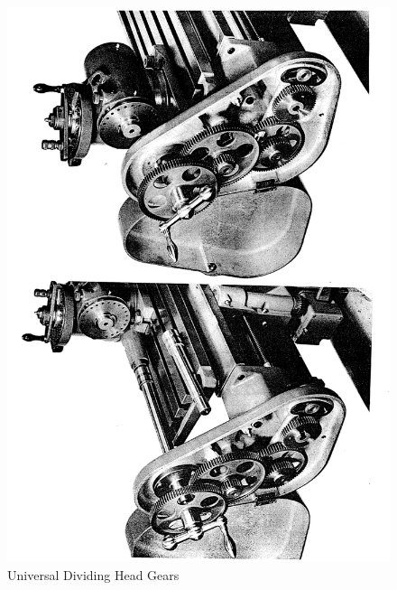 \newpage
\begin{figure}[h]
    \centering
    \includegraphics[width=1.0\linewidth]{images/page_50}
    \caption{Universal Dividing Head Gears}
    \label{fig:universal_dividing_head_gears}
\end{figure}